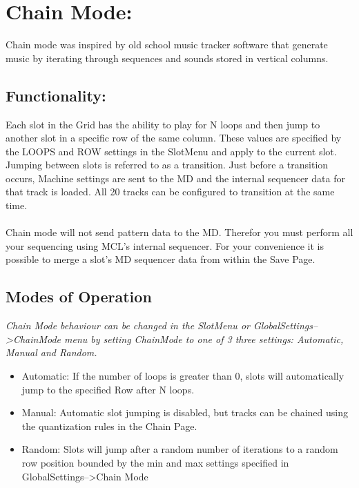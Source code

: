 \chapter{Chain Mode:}
Chain mode was inspired by old school music tracker software that generate music by iterating through sequences and sounds stored in vertical columns.
\section{Functionality:}
Each slot in the Grid has the ability to play for N loops and then jump to another slot in a specific row of the same column.  These values are specified by the LOOPS and ROW settings in the SlotMenu and apply to the current slot. Jumping between slots is referred to as a transition. Just before a transition occurs, Machine settings are sent to the MD and the internal sequencer data for that track is loaded. All 20 tracks can be configured to transition at the same time.\\
 \\
Chain mode will not send pattern data to the MD. Therefor you must perform all your sequencing using MCL's internal sequencer. For your convenience it is possible to merge a slot's MD sequencer data from within the Save Page.
\section{Modes of Operation}
\textit{Chain Mode behaviour can be changed in the SlotMenu or GlobalSettings-->ChainMode menu by setting ChainMode to one of 3 three settings: Automatic, Manual and Random.}

\begin{itemize}
	\item Automatic: If the number of loops is greater than 0, slots will automatically jump to the specified Row after N loops.
	\item Manual: Automatic slot jumping is disabled, but tracks can be chained using the quantization rules in the Chain Page.
	\item Random: Slots will jump after a random number of iterations to a random row position bounded by the min and max settings specified in GlobalSettings-->Chain Mode
\end{itemize}


